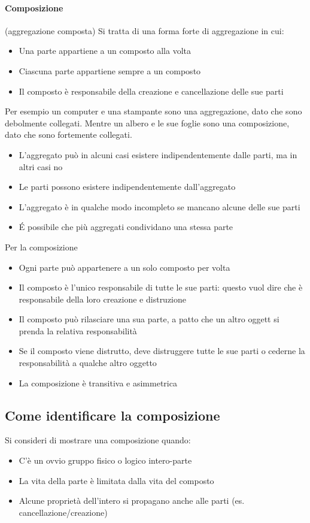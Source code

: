 \paragraph*{Composizione} (aggregazione composta) Si tratta di una forma forte di
aggregazione in cui:
\begin{itemize}
    \item Una parte appartiene a un composto alla volta
    \item Ciascuna parte appartiene sempre a un composto
    \item Il composto è responsabile della creazione e cancellazione delle sue parti
\end{itemize}
Per esempio un computer e una stampante sono una aggregazione, dato che sono
debolmente collegati. Mentre un albero e le sue foglie sono una composizione, dato che
sono fortemente collegati.
\begin{itemize}
    \item L'aggregato può in alcuni casi esistere indipendentemente dalle parti, ma in 
    altri casi no
    \item Le parti possono esistere indipendentemente dall'aggregato
    \item L'aggregato è in qualche modo incompleto se mancano alcune delle sue parti
    \item \'E possibile che più aggregati condividano una stessa parte
\end{itemize}
Per la composizione
\begin{itemize}
    \item Ogni parte può appartenere a un solo composto per volta 
    \item Il composto è l'unico responsabile di tutte le sue parti: questo
    vuol dire che è responsabile della loro creazione e distruzione
    \item Il composto può rilasciare una sua parte, a patto che un altro
    oggett si prenda la relativa responsabilità
    \item Se il composto viene distrutto, deve distruggere tutte le sue parti o
    cederne la responsabilità a qualche altro oggetto
    \item La composizione è transitiva e asimmetrica
\end{itemize}
\subsection*{Come identificare la composizione}
Si consideri di mostrare una composizione quando:
\begin{itemize}
    \item C'è un ovvio gruppo fisico o logico intero-parte
    \item La vita della parte è limitata dalla vita del composto
    \item Alcune proprietà dell'intero si propagano anche alle parti (es. cancellazione/creazione)
\end{itemize}
